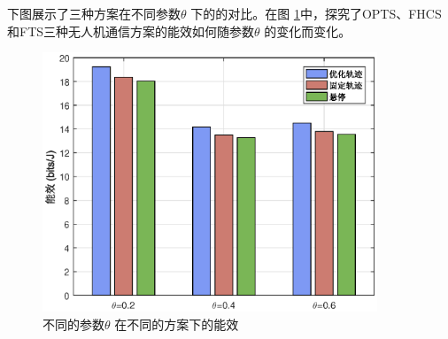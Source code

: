 下图展示了三种方案在不同参数$\theta$ 下的的对比。在图 \ref{不同的参数在不同的方案下的能效}中，探究了OPTS、FHCS 和FTS三种无人机通信方案的能效如何随参数$\theta$ 的变化而变化。
\begin{figure}[H]
\centering
\includegraphics[width=10cm]{figures//chap4//不同的参数在不同的方案下的能效.eps}
\caption{不同的参数$\theta$ 在不同的方案下的能效}
\label{不同的参数在不同的方案下的能效}
\end{figure}

